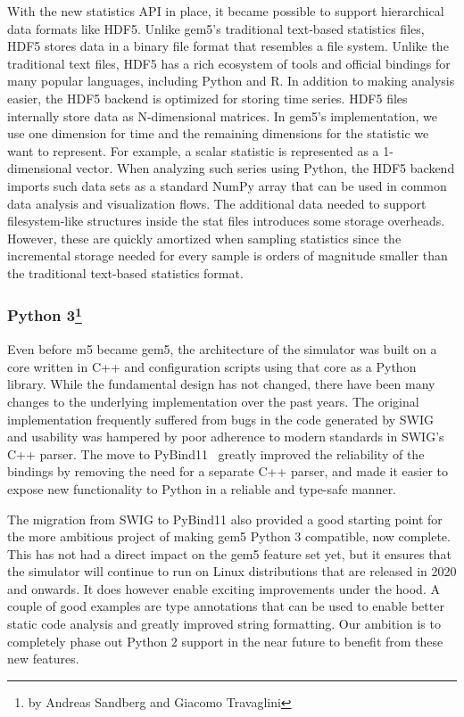 With the new statistics API in place, it became possible to support hierarchical data formats like HDF5.
Unlike gem5's traditional text-based statistics files, HDF5 stores data in a binary file format that resembles a file system.
Unlike the traditional text files, HDF5 has a rich ecosystem of tools and official bindings for many popular languages, including Python and R.
 In addition to making analysis easier, the HDF5 backend is optimized for storing time series.
HDF5 files internally store data as N-dimensional matrices.
In gem5's implementation, we use one dimension for time and the remaining dimensions for the statistic we want to represent.
For example, a scalar statistic is represented as a 1-dimensional vector.
When analyzing such series using Python, the HDF5 backend imports such data sets as a standard NumPy array that can be used in common data analysis and visualization flows.
The additional data needed to support filesystem-like structures inside the stat files introduces some storage overheads.
However, these are quickly amortized when sampling statistics since the incremental storage needed for every sample is orders of magnitude smaller than the traditional text-based statistics format.

\subsubsection[Python 3]{Python 3\footnote{by Andreas Sandberg and Giacomo Travaglini}}

Even before m5 became gem5, the architecture of the simulator was built on a core written in C++ and configuration scripts using that core as a Python library.
While the fundamental design has not changed, there have been many changes to the underlying implementation over the past years.
The original implementation frequently suffered from bugs in the code generated by SWIG and usability was hampered by poor adherence to modern standards in SWIG's C++ parser.
The move to PyBind11~\cite{} greatly improved the reliability of the bindings by removing the need for a separate C++ parser, and made it easier to expose new functionality to Python in a reliable and type-safe manner.

The migration from SWIG to PyBind11 also provided a good starting point for the more ambitious project of making gem5 Python 3 compatible, now complete.
This has not had a direct impact on the gem5 feature set yet, but it ensures that the simulator will continue to run on Linux distributions that are released in 2020 and onwards.
It does however enable exciting improvements under the hood.
A couple of good examples are type annotations that can be used to enable better static code analysis and greatly improved string formatting.
Our ambition is to completely phase out Python 2 support in the near future to benefit from these new features.

